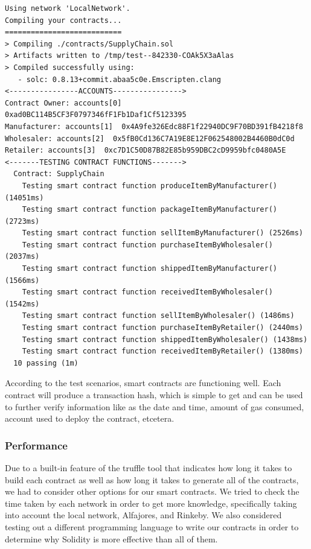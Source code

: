 \begin{lstlisting}[numbers=none, basicstyle=\ttfamily\tiny]
Using network 'LocalNetwork'.
Compiling your contracts...
===========================
> Compiling ./contracts/SupplyChain.sol
> Artifacts written to /tmp/test--842330-COAk5X3aAlas
> Compiled successfully using:
   - solc: 0.8.13+commit.abaa5c0e.Emscripten.clang
<----------------ACCOUNTS---------------->
Contract Owner: accounts[0]  0xad0BC114B5CF3F0797346fF1Fb1Daf1Cf5123395
Manufacturer: accounts[1]  0x4A9fe326Edc88F1f22940DC9F70BD391fB4218f8
Wholesaler: accounts[2]  0x5fB0Cd136C7A19E8E12F062548002B4460B0dC0d
Retailer: accounts[3]  0xc7D1C50D87B82E85b959DBC2cD9959bfc0480A5E
<-------TESTING CONTRACT FUNCTIONS------->
  Contract: SupplyChain
    Testing smart contract function produceItemByManufacturer() (14051ms)
    Testing smart contract function packageItemByManufacturer() (2723ms)
    Testing smart contract function sellItemByManufacturer() (2526ms)
    Testing smart contract function purchaseItemByWholesaler() (2037ms)
    Testing smart contract function shippedItemByManufacturer() (1566ms)
    Testing smart contract function receivedItemByWholesaler() (1542ms)
    Testing smart contract function sellItemByWholesaler() (1486ms)
    Testing smart contract function purchaseItemByRetailer() (2440ms)
    Testing smart contract function shippedItemByWholesaler() (1438ms)
    Testing smart contract function receivedItemByRetailer() (1380ms)
  10 passing (1m)
\end{lstlisting}

\vspace{.5cm}

According to the test scenarios, smart contracts are functioning well. Each contract will produce a transaction hash, which is simple to get and can be used to further verify information like as the date and time, amount of gas consumed, account used to deploy the contract, etcetera.

\subsubsection{Performance}

Due to a built-in feature of the truffle tool that indicates how long it takes to build each contract as well as how long it takes to generate all of the contracts, we had to consider other options for our smart contracts. We tried to check the time taken by each network in order to get more knowledge, specifically taking into account the local network, Alfajores, and Rinkeby. We also considered testing out a different programming language to write our contracts in order to determine why Solidity is more effective than all of them.


